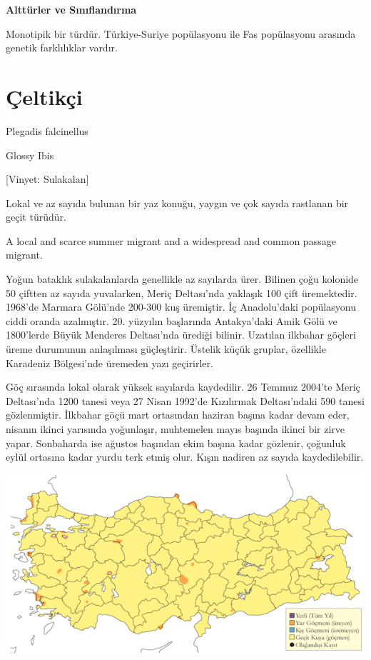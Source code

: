 \documentclass[
  letterpaper,
  DIV=11,
  numbers=noendperiod]{scrreprt}
\begin{document}
\textbf{Alttürler ve Sınıflandırma}

Monotipik bir türdür. Türkiye-Suriye popülasyonu ile Fas popülasyonu
arasında genetik farklılıklar vardır.

\section{Çeltikçi}\label{uxe7eltikuxe7i}

Plegadis falcinellus

Glossy Ibis

{[}Vinyet: Sulakalan{]}

Lokal ve az sayıda bulunan bir yaz konuğu, yaygın ve çok sayıda
rastlanan bir geçit türüdür.

A local and scarce summer migrant and a widespread and common passage
migrant.

Yoğun bataklık sulakalanlarda genellikle az sayılarda ürer. Bilinen çoğu
kolonide 50 çiftten az sayıda yuvalarken, Meriç Deltası'nda yaklaşık 100
çift üremektedir. 1968'de Marmara Gölü'nde 200-300 kuş üremiştir. İç
Anadolu'daki popülasyonu ciddi oranda azalmıştır. 20. yüzyılın
başlarında Antakya'daki Amik Gölü ve 1800'lerde Büyük Menderes
Deltası'nda ürediği bilinir. Uzatılan ilkbahar göçleri üreme durumunun
anlaşılması güçleştirir. Üstelik küçük gruplar, özellikle Karadeniz
Bölgesi'nde üremeden yazı geçirirler.

Göç sırasında lokal olarak yüksek sayılarda kaydedilir. 26 Temmuz
2004'te Meriç Deltası'nda 1200 tanesi veya 27 Nisan 1992'de Kızılırmak
Deltası'ndaki 590 tanesi gözlenmiştir. İlkbahar göçü mart ortasından
haziran başına kadar devam eder, nisanın ikinci yarısında yoğunlaşır,
muhtemelen mayıs başında ikinci bir zirve yapar. Sonbaharda ise ağustos
başından ekim başına kadar gözlenir, çoğunluk eylül ortasına kadar yurdu
terk etmiş olur. Kışın nadiren az sayıda kaydedilebilir.

\includegraphics{images/harita_Page_062.png}
\end{document}
